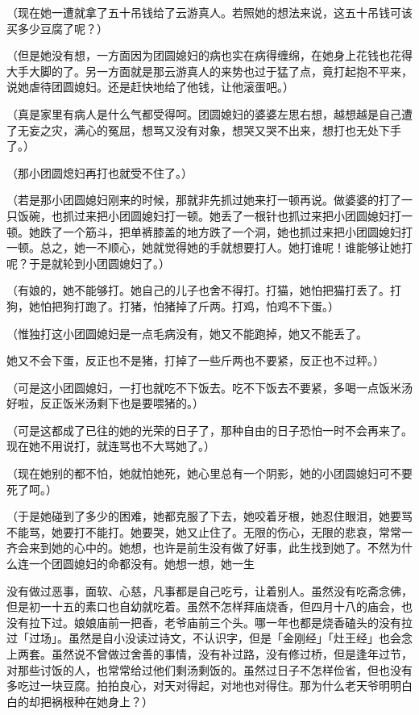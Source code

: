 \documentclass[UTF8]{ctexart}
\begin{document}
（现在她一遭就拿了五十吊钱给了云游真人。若照她的想法来说，这五十吊钱可该买多少豆腐了呢？）

（但是她没有想，一方面因为团圆媳妇的病也实在病得缠绵，在她身上花钱也花得大手大脚的了。另一方面就是那云游真人的来势也过于猛了点，竟打起抱不平来，说她虐待团圆媳妇。还是赶快地给了他钱，让他滚蛋吧。）

（真是家里有病人是什么气都受得呵。团圆媳妇的婆婆左思右想，越想越是自己遭了无妄之灾，满心的冤屈，想骂又没有对象，想哭又哭不出来，想打也无处下手了。）

（那小团圆熄妇再打也就受不住了。）

（若是那小团圆媳妇刚来的时候，那就非先抓过她来打一顿再说。做婆婆的打了一只饭碗，也抓过来把小团圆媳妇打一顿。她丢了一根针也抓过来把小团圆媳妇打一顿。她跌了一个筋斗，把单裤膝盖的地方跌了一个洞，她也抓过来把小团圆媳妇打一顿。总之，她一不顺心，她就觉得她的手就想要打人。她打谁呢！谁能够让她打呢？于是就轮到小团圆媳妇了。）

（有娘的，她不能够打。她自己的儿子也舍不得打。打猫，她怕把猫打丢了。打狗，她怕把狗打跑了。打猪，怕猪掉了斤两。打鸡，怕鸡不下蛋。）

（惟独打这小团圆媳妇是一点毛病没有，她又不能跑掉，她又不能丢了。

她又不会下蛋，反正也不是猪，打掉了一些斤两也不要紧，反正也不过秤。）

（可是这小团圆媳妇，一打也就吃不下饭去。吃不下饭去不要紧，多喝一点饭米汤好啦，反正饭米汤剩下也是要喂猪的。）

（可是这都成了已往的她的光荣的日子了，那种自由的日子恐怕一时不会再来了。现在她不用说打，就连骂也不大骂她了。）

（现在她别的都不怕，她就怕她死，她心里总有一个阴影，她的小团圆媳妇可不要死了呵。）

（于是她碰到了多少的困难，她都克服了下去，她咬着牙根，她忍住眼泪，她要骂不能骂，她要打不能打。她要哭，她又止住了。无限的伤心，无限的悲哀，常常一齐会来到她的心中的。她想，也许是前生没有做了好事，此生找到她了。不然为什么连一个团圆媳妇的命都没有。她想一想，她一生

没有做过恶事，面软、心慈，凡事都是自己吃亏，让着别人。虽然没有吃斋念佛，但是初一十五的素口也自幼就吃着。虽然不怎样拜庙烧香，但四月十八的庙会，也没有拉下过。娘娘庙前一把香，老爷庙前三个头。哪一年也都是烧香磕头的没有拉过「过场」。虽然是自小没读过诗文，不认识字，但是「金刚经」「灶王经」也会念上两套。虽然说不曾做过舍善的事情，没有补过路，没有修过桥，但是逢年过节，对那些讨饭的人，也常常给过他们剩汤剩饭的。虽然过日子不怎样俭省，但也没有多吃过一块豆腐。拍拍良心，对天对得起，对地也对得住。那为什么老天爷明明白白的却把祸根种在她身上？）
\end{document}
